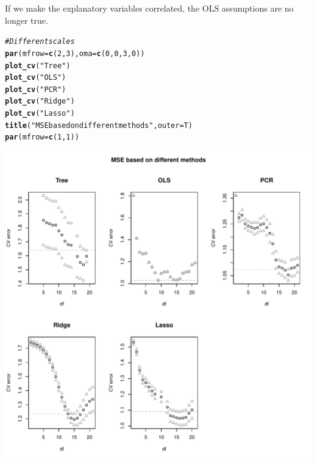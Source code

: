 \documentclass[11pt]{article}\usepackage[]{graphicx}\usepackage[]{color}
\makeatletter
\def\maxwidth{ %
  \ifdim\Gin@nat@width>\linewidth
    \linewidth
  \else
    \Gin@nat@width
  \fi
}
\newcommand{\hlnum}[1]{\textcolor[rgb]{0.686,0.059,0.569}{#1}}%
\newcommand{\hlstr}[1]{\textcolor[rgb]{0.192,0.494,0.8}{#1}}%
\newcommand{\hlcom}[1]{\textcolor[rgb]{0.678,0.584,0.686}{\textit{#1}}}%
\newcommand{\hlstd}[1]{\textcolor[rgb]{0.345,0.345,0.345}{#1}}%
\newcommand{\hlkwc}[1]{\textcolor[rgb]{0.333,0.667,0.333}{#1}}%
\newcommand{\hlkwd}[1]{\textcolor[rgb]{0.737,0.353,0.396}{\textbf{#1}}}%
\newenvironment{kframe}{%
 \def\at@end@of@kframe{}%
 \ifinner\ifhmode%
  \def\at@end@of@kframe{\end{minipage}}%
  \begin{minipage}{\columnwidth}%
 \fi\fi%
 \def\FrameCommand##1{\hskip\@totalleftmargin \hskip-\fboxsep
 \colorbox{shadecolor}{##1}\hskip-\fboxsep
     \hskip-\linewidth \hskip-\@totalleftmargin \hskip\columnwidth}%
 \MakeFramed {\advance\hsize-\width
   \@totalleftmargin\z@ \linewidth\hsize
   \@setminipage}}%
 {\par\unskip\endMakeFramed%
 \at@end@of@kframe}
\newenvironment{knitrout}{}{} %
\makeatother
\begin{document}
If we make the explanatory variables correlated, the OLS assumptions are no longer true. 

\begin{knitrout}
\color{fgcolor}\begin{kframe}
\begin{alltt}
\hlcom{# Different scales}
\hlkwd{par}\hlstd{(}\hlkwc{mfrow}\hlstd{=}\hlkwd{c}\hlstd{(}\hlnum{2}\hlstd{,}\hlnum{3}\hlstd{),}\hlkwc{oma}\hlstd{=}\hlkwd{c}\hlstd{(}\hlnum{0}\hlstd{,}\hlnum{0}\hlstd{,}\hlnum{3}\hlstd{,}\hlnum{0}\hlstd{))}
\hlkwd{plot_cv}\hlstd{(}\hlstr{"Tree"}\hlstd{)}
\hlkwd{plot_cv}\hlstd{(}\hlstr{"OLS"} \hlstd{)}
\hlkwd{plot_cv}\hlstd{(}\hlstr{"PCR"} \hlstd{)}
\hlkwd{plot_cv}\hlstd{(}\hlstr{"Ridge"}\hlstd{)}
\hlkwd{plot_cv}\hlstd{(}\hlstr{"Lasso"}\hlstd{)}
\hlkwd{title}\hlstd{(}\hlstr{"MSE based on different methods"}\hlstd{,}\hlkwc{outer}\hlstd{=T)}
\hlkwd{par}\hlstd{(}\hlkwc{mfrow}\hlstd{=}\hlkwd{c}\hlstd{(}\hlnum{1}\hlstd{,}\hlnum{1}\hlstd{))}
\end{alltt}
\end{kframe}
\includegraphics[width=\maxwidth]{figure/unnamed-chunk-6-1} 

\end{knitrout}
\end{document}
